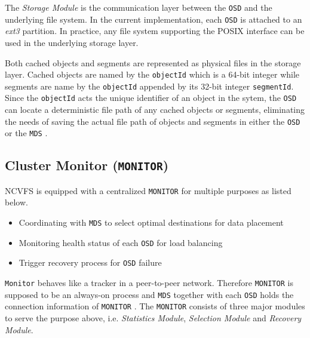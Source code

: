 \documentclass{article}
\def\osd{\texttt{OSD} }
\def\mds{\texttt{MDS} }
\def\monitor{\texttt{MONITOR} }
\begin{document}
The \textit{Storage Module} is the communication layer between the \osd and the underlying file 
system. In the current implementation, each \osd is attached to an \textit{ext3} partition.
In practice, any file system supporting the POSIX interface can be used in the underlying storage
layer. 

Both cached objects and segments are represented as physical files in the storage layer. 
Cached objects are named by the \texttt{objectId} which is a 64-bit integer while segments
are name by the \texttt{objectId} appended by its 32-bit integer \texttt{segmentId}. 
Since the \texttt{objectId} acts the unique identifier of an object in the
sytem, the \osd can locate a deterministic file path of any cached objects or
segments, eliminating the needs of saving the actual file path of objects and
segments in either the \osd or the \mds .

\subsection{Cluster Monitor (\texttt{MONITOR})}
NCVFS is equipped with a centralized \monitor for multiple 
purposes as listed below.
\begin{itemize}
	\item Coordinating with \mds to select optimal destinations for data placement
	\item Monitoring health status of each \osd for load balancing
	\item Trigger recovery process for \osd failure
\end{itemize}

\texttt{Monitor} behaves like a tracker in a peer-to-peer network. Therefore 
\monitor is supposed to be an always-on process and \mds together with each \osd
holds the connection information of \monitor. The \monitor consists of three 
major modules to serve the purpose above, i.e. \textit{Statistics Module},
\textit{Selection Module} and \textit{Recovery Module}.
\end{document}
